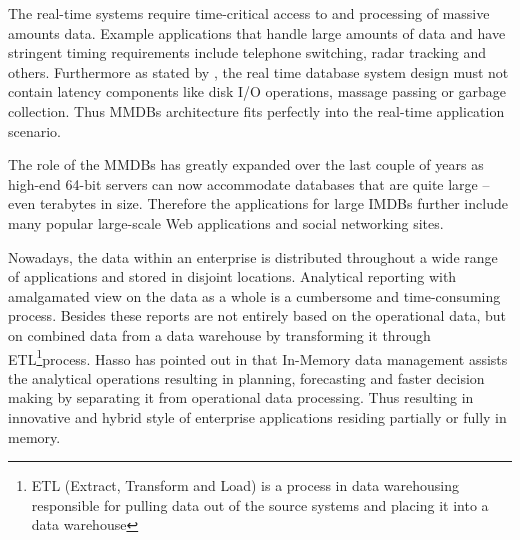 \documentclass[10pt]{article} %
\begin{document}
The real-time systems require time-critical access to and processing of massive amounts data. Example applications that handle large amounts of data and have stringent timing requirements include telephone switching, radar tracking and others. Furthermore as stated by \cite{ilprints39}, the real time database system design must not contain latency components like disk I/O operations, massage passing or garbage collection. Thus MMDBs architecture fits perfectly into the real-time application scenario. 

The role of the MMDBs has greatly expanded over the last couple of years as high-end 64-bit servers can now accommodate databases that are quite large – even terabytes in size. Therefore the applications for large IMDBs further include many popular large-scale Web applications and social networking sites. 

Nowadays, the data within an enterprise is distributed throughout a wide range of applications and stored in disjoint locations. Analytical reporting with amalgamated view on the data as a whole is a cumbersome and time-consuming process. Besides these reports are not entirely based on the operational data, but on combined data from a data warehouse by transforming it through ETL\footnote{ETL (Extract, Transform and Load) is a process in data warehousing responsible for pulling data out of the source systems and placing it into a data warehouse}process. Hasso has pointed out in \cite{plattner2011memory} that In-Memory data management assists the analytical operations resulting in planning, forecasting and faster decision making by separating it from operational data processing. Thus resulting in innovative and hybrid style of enterprise applications residing partially or fully in memory. 

\end{document}
